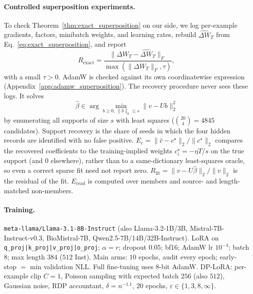 \documentclass[11pt]{article}
\theoremstyle{plain}
\theoremstyle{definition}
\begin{document}
\paragraph{Controlled superposition experiments.}
To check Theorem~\ref{thm:exact_superposition} on our side, we log per-example gradients, factors, minibatch weights, and learning rates, rebuild $\widehat{\Delta W}_T$ from Eq.~\eqref{eq:exact_superposition}, and report
\begin{equation}
R_{\mathrm{exact}}=
\frac{\|\Delta W_T-\widehat{\Delta W}_T\|_F}
{\max(\|\Delta W_T\|_F,\tau)},
\label{eq:identity_metric}
\end{equation}
with a small $\tau>0$. AdamW is checked against its own coordinatewise expression (Appendix~\ref{app:adamw_superposition}).
The recovery procedure never sees these logs.
It solves
\begin{equation}
\widehat\beta\in\arg\min_{b\geq0,\,\|b\|_0\leq s}
\|v-Ub\|_2^2
\label{eq:verification_estimator}
\end{equation}
by enumerating all supports of size $s$ with least squares ($\binom{20}{4}=4845$ candidates).
Support recovery is the share of seeds in which the four hidden records are identified with no false positive.
$E_c=\|\widehat c-c^\star\|_2/\|c^\star\|_2$ compares the recovered coefficients to the training-implied weights $c^\star_i={-}\eta T/s$ on the true support (and $0$ elsewhere), rather than to a same-dictionary least-squares oracle, so even a correct sparse fit need not report zero.
$R_{\mathrm{fit}}=\|v-U\widehat\beta\|_2/\|v\|_2$ is the residual of the fit.
$E_{\mathrm{read}}$ is computed over members and source- and length-matched non-members.

\paragraph{Training.}
\texttt{meta-llama/Llama-3.1-8B-Instruct} (also Llama-3.2-1B/3B,
Mistral-7B-Instruct-v0.3, BioMistral-7B, Qwen2.5-7B/14B/32B-Instruct). LoRA on
\texttt{q\_proj|k\_proj|v\_proj|o\_proj}; $\alpha{=}r$; dropout $0.05$;
bf16; AdamW lr $10^{-4}$; batch $8$; max length $384$ ($512$ Inst).
Main arms: $10$ epochs, audit every epoch; early-stop $=$ min
validation NLL. Full fine-tuning uses 8-bit AdamW. DP-LoRA: per-example clip $C{=}1$, Poisson sampling
with expected batch $256$ (also $512$), Gaussian noise, RDP accountant,
$\delta=n^{-1.1}$, $20$ epochs, $\varepsilon\in\{1,3,8,\infty\}$.
\end{document}
